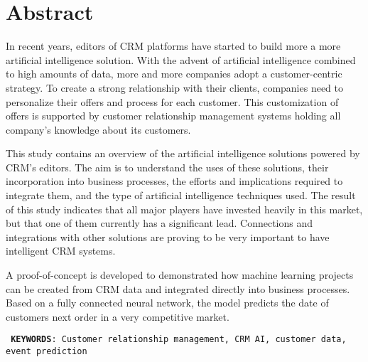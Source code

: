 

\chapter*{Abstract}

\vspace{0.5cm}

In recent years, editors of CRM platforms have started to build more a more artificial intelligence solution. With the advent of artificial intelligence combined to high amounts of data, more and more companies adopt a customer-centric strategy. To create a strong relationship with their clients, companies need to personalize their offers and process for each customer. This customization of offers is supported by customer relationship management systems holding all company's knowledge about its customers.

This study contains an overview of the artificial intelligence solutions powered by CRM's editors. The aim is to understand the uses of these solutions, their incorporation into business processes, the efforts and implications required to integrate them, and the type of artificial intelligence techniques used. The result of this study indicates that all major players have invested heavily in this market, but that one of them currently has a significant lead. Connections and integrations with other solutions are proving to be very important to have intelligent CRM systems.

A proof-of-concept is developed to demonstrated how machine learning projects can be created from CRM data and integrated directly into business processes. Based on a fully connected neural network, the model predicts the date of customers next order in a very competitive market.

\vspace{0.7cm}

\texttt{ \justifyi \textbf{KEYWORDS}: Customer relationship management, CRM AI, customer data, event prediction}

